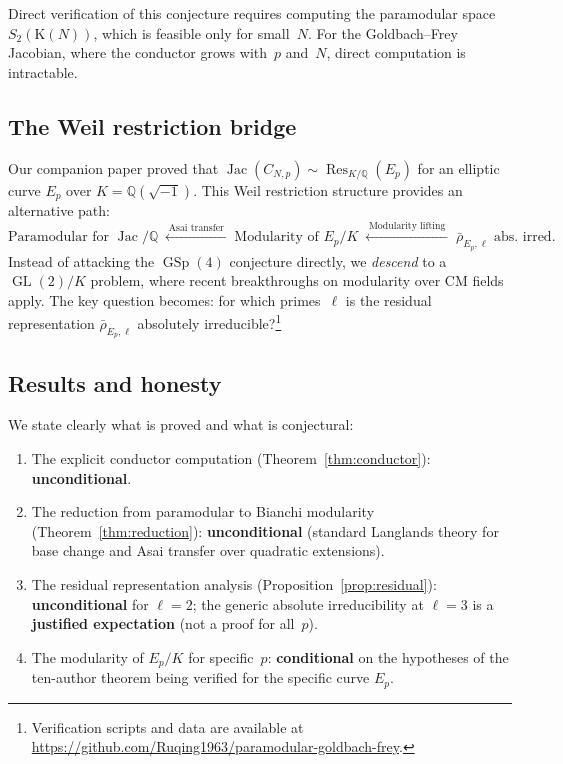 \documentclass[11pt,a4paper]{article}
\theoremstyle{definition}
\DeclareMathOperator{\GL}{GL}
\DeclareMathOperator{\GSp}{GSp}
\DeclareMathOperator{\Jac}{Jac}
\DeclareMathOperator{\Res}{Res}
\begin{document}
Direct verification of this conjecture requires computing the paramodular space $S_2(\mathrm{K}(N))$, which is feasible only for small~$N$. For the Goldbach--Frey Jacobian, where the conductor grows with~$p$ and~$N$, direct computation is intractable.

\subsection{The Weil restriction bridge}

Our companion paper \cite{Companion7} proved that $\Jac(C_{N,p}) \sim \Res_{K/\mathbb{Q}}(E_p)$ for an elliptic curve $E_p$ over $K = \mathbb{Q}(\sqrt{-1})$. This Weil restriction structure provides an alternative path:
$$\boxed{\text{Paramodular for } \Jac/\mathbb{Q}} \;\xleftarrow{\;\text{Asai transfer}\;}\; \boxed{\text{Modularity of } E_p/K} \;\xleftarrow{\;\text{Modularity lifting}\;}\; \boxed{\bar{\rho}_{E_p,\ell} \text{ abs.\ irred.}}$$
Instead of attacking the $\GSp(4)$ conjecture directly, we \emph{descend} to a $\GL(2)/K$ problem, where recent breakthroughs on modularity over CM fields apply. The key question becomes: for which primes~$\ell$ is the residual representation $\bar{\rho}_{E_p,\ell}$ absolutely irreducible?\footnote{Verification scripts and data are available at \url{https://github.com/Ruqing1963/paramodular-goldbach-frey}.}

\subsection{Results and honesty}

We state clearly what is proved and what is conjectural:
\begin{enumerate}
    \item[\textup{(a)}] The explicit conductor computation (Theorem~\ref{thm:conductor}): \textbf{unconditional}.
    \item[\textup{(b)}] The reduction from paramodular to Bianchi modularity (Theorem~\ref{thm:reduction}): \textbf{unconditional} (standard Langlands theory for base change and Asai transfer over quadratic extensions).
    \item[\textup{(c)}] The residual representation analysis (Proposition~\ref{prop:residual}): \textbf{unconditional} for $\ell = 2$; the generic absolute irreducibility at $\ell = 3$ is a \textbf{justified expectation} (not a proof for all~$p$).
    \item[\textup{(d)}] The modularity of $E_p/K$ for specific~$p$: \textbf{conditional} on the hypotheses of the ten-author theorem \cite{TenAuthor} being verified for the specific curve $E_p$.
\end{enumerate}
\end{document}
